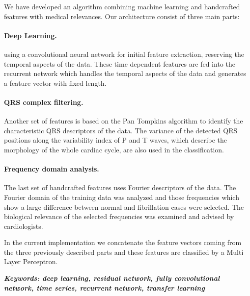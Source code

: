 We have developed an algorithm combining machine learning and handcrafted
features with medical relevances.
Our architecture consist of three main parts:

\paragraph{Deep Learning.} using a
convolutional neural network for initial feature extraction, reserving the
temporal aspects of the data. These time dependent features are fed into
the recurrent network which handles the temporal aspects of the data and
generates a feature vector with fixed length.

\paragraph{QRS complex filtering.}
Another set of features is based on the Pan Tompkins algorithm to identify the
characteristic QRS descriptors of the data. The variance of the detected QRS
positions along the variability index of P and T waves, which describe the morphology of the whole cardiac cycle, are also used in the classification.

\paragraph{Frequency domain analysis.} The last set of handcrafted features uses Fourier descriptors of the data.
The Fourier domain of the training data was analyzed and those frequencies which
show a large difference between normal and fibrillation cases were selected. The
biological relevance of the selected frequencies was examined and advised by
cardiologists.

In the current implementation we concatenate the feature vectors coming from the
three previously described parts and these features are classified by a Multi Layer Perceptron.

\textit{\textbf{Keywords: deep learning, residual network, fully convolutional network, time series, recurrent network, transfer learning}}
